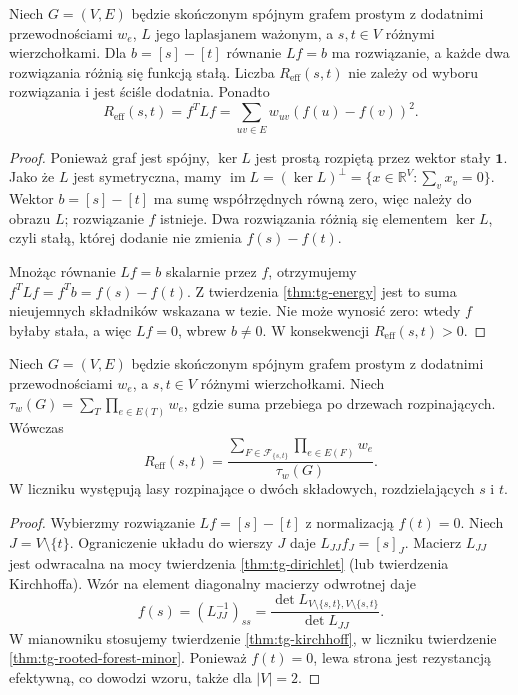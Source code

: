 \begin{stwierdzenie}
Niech $G=(V,E)$ będzie skończonym spójnym grafem
prostym z dodatnimi przewodnościami $w_e$,
$L$ jego laplasjanem ważonym, a $s,t\in V$ różnymi
wierzchołkami. Dla $b=[s]-[t]$ równanie $Lf=b$ ma
rozwiązanie, a każde dwa rozwiązania różnią się funkcją stałą.
Liczba $R_{\mathrm{eff}}(s,t)$ nie zależy od wyboru rozwiązania
i jest ściśle dodatnia. Ponadto
\[
R_{\mathrm{eff}}(s,t)=f^TLf
   =\sum_{uv\in E}w_{uv}(f(u)-f(v))^2.
\]
\end{stwierdzenie}

\begin{proof}
Ponieważ graf jest spójny, $\ker L$ jest prostą
rozpiętą przez wektor stały $\mathbf1$. Jako że $L$
jest symetryczna, mamy
$\operatorname{im}L=(\ker L)^\perp
=\{x\in\mathbb R^V:\sum_vx_v=0\}$.
Wektor $b=[s]-[t]$ ma sumę współrzędnych równą zero,
więc należy do obrazu $L$; rozwiązanie $f$ istnieje.
Dwa rozwiązania różnią się elementem $\ker L$,
czyli stałą, której dodanie nie zmienia $f(s)-f(t)$.

Mnożąc równanie $Lf=b$ skalarnie przez $f$,
otrzymujemy $f^TLf=f^Tb=f(s)-f(t)$.
Z twierdzenia \ref{thm:tg-energy} jest to suma
nieujemnych składników wskazana w tezie.
Nie może wynosić zero: wtedy $f$ byłaby stała,
a więc $Lf=0$, wbrew $b\ne0$. W konsekwencji
$R_{\mathrm{eff}}(s,t)>0$.
\end{proof}

\begin{samepage}
\begin{wniosek}
\label{cor:tg-resistance-forest}
Niech $G=(V,E)$ będzie skończonym spójnym grafem
prostym z dodatnimi przewodnościami $w_e$,
a $s,t\in V$ różnymi wierzchołkami.
Niech $\tau_w(G)=\sum_T\prod_{e\in E(T)}w_e$,
gdzie suma przebiega po drzewach rozpinających.
Wówczas
\[
R_{\mathrm{eff}}(s,t)=
\frac{\displaystyle\sum_{F\in\mathcal F_{\{s,t\}}}
                \prod_{e\in E(F)}w_e}{\tau_w(G)}.
\]
W liczniku występują lasy rozpinające o dwóch
składowych, rozdzielających $s$ i $t$.
\end{wniosek}
\end{samepage}
\begin{proof}
Wybierzmy rozwiązanie $Lf=[s]-[t]$ z normalizacją
$f(t)=0$. Niech $J=V\setminus\{t\}$.
Ograniczenie układu do wierszy $J$ daje
$L_{JJ}f_J=[s]_J$. Macierz $L_{JJ}$ jest odwracalna
na mocy twierdzenia \ref{thm:tg-dirichlet} (lub
twierdzenia Kirchhoffa).
Wzór na element diagonalny macierzy odwrotnej daje
\[
f(s)=(L_{JJ}^{-1})_{ss}
=\frac{\det L_{V\setminus\{s,t\},V\setminus\{s,t\}}}
       {\det L_{JJ}}.
\]
W mianowniku stosujemy twierdzenie \ref{thm:tg-kirchhoff},
w liczniku twierdzenie \ref{thm:tg-rooted-forest-minor}.
Ponieważ $f(t)=0$, lewa strona jest rezystancją
efektywną, co dowodzi wzoru, także dla $|V|=2$.
\end{proof}


